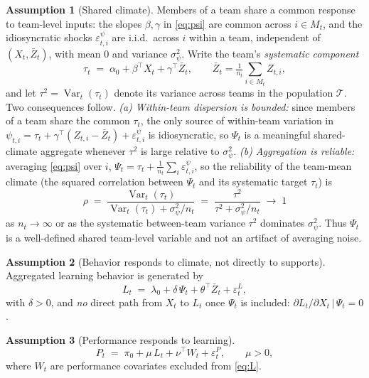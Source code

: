 \documentclass{amsart}
\theoremstyle{definition}
\newtheorem{assumption}{Assumption}
\theoremstyle{remark}
\begin{document}
\begin{assumption}[Shared climate]\label{ass:share}
Members of a team share a common response to team-level inputs: the slopes
$\beta,\gamma$ in \eqref{eq:psi} are common across $i\in M_t$, and the
idiosyncratic shocks $\varepsilon^{\psi}_{t,i}$ are i.i.d.\ across $i$
within a team, independent of $(X_t,\bar Z_t)$, with mean $0$ and variance
$\sigma^2_\psi$. Write the team's \emph{systematic component}
\[
\tau_t \;=\; \alpha_0+\beta^\top X_t+\gamma^\top\bar Z_t,
\qquad
\bar Z_t=\tfrac1{n_t}\textstyle\sum_{i\in M_t} Z_{t,i},
\]
and let $\tau^2=\operatorname{Var}_{t}(\tau_t)$ denote its variance across
teams in the population $\mathcal T$. Two consequences follow.
\emph{(a) Within-team dispersion is bounded:} since members of a team share
the common $\tau_t$, the only source of within-team variation in
$\psi_{t,i}=\tau_t+\gamma^\top(Z_{t,i}-\bar Z_t)+\varepsilon^{\psi}_{t,i}$
is idiosyncratic, so $\Psi_t$ is a meaningful shared-climate aggregate
whenever $\tau^2$ is large relative to $\sigma^2_\psi$.
\emph{(b) Aggregation is reliable:} averaging \eqref{eq:psi} over $i$,
$\Psi_t=\tau_t+\tfrac1{n_t}\sum_i\varepsilon^{\psi}_{t,i}$, so the
reliability of the team-mean climate (the squared correlation between
$\Psi_t$ and its systematic target $\tau_t$) is
\[
\rho \;=\;
\frac{\operatorname{Var}_t(\tau_t)}
     {\operatorname{Var}_t(\tau_t)+\sigma^2_\psi/n_t}
\;=\;\frac{\tau^2}{\tau^2+\sigma^2_\psi/n_t}\;\longrightarrow\;1
\]
as $n_t\to\infty$ or as the systematic between-team variance $\tau^2$
dominates $\sigma^2_\psi$. Thus $\Psi_t$ is a well-defined shared
team-level variable and not an artifact of averaging noise.
\end{assumption}

\begin{assumption}[Behavior responds to climate, not directly to supports]%
\label{ass:behavior}
Aggregated learning behavior is generated by
\begin{equation}\label{eq:L}
L_t \;=\; \lambda_0 + \delta\,\Psi_t + \theta^{\top}\bar Z_t
          + \varepsilon^{L}_t,
\end{equation}
with $\delta>0$, and \emph{no} direct path from $X_t$ to $L_t$ once
$\Psi_t$ is included: $\partial L_t/\partial X_t \,|\, \Psi_t = 0$.
\end{assumption}

\begin{assumption}[Performance responds to learning]\label{ass:perf}
\begin{equation}\label{eq:P}
P_t \;=\; \pi_0 + \mu\, L_t + \nu^{\top} W_t + \varepsilon^{P}_t,
\qquad \mu>0,
\end{equation}
where $W_t$ are performance covariates excluded from \eqref{eq:L}.
\end{assumption}
\end{document}
